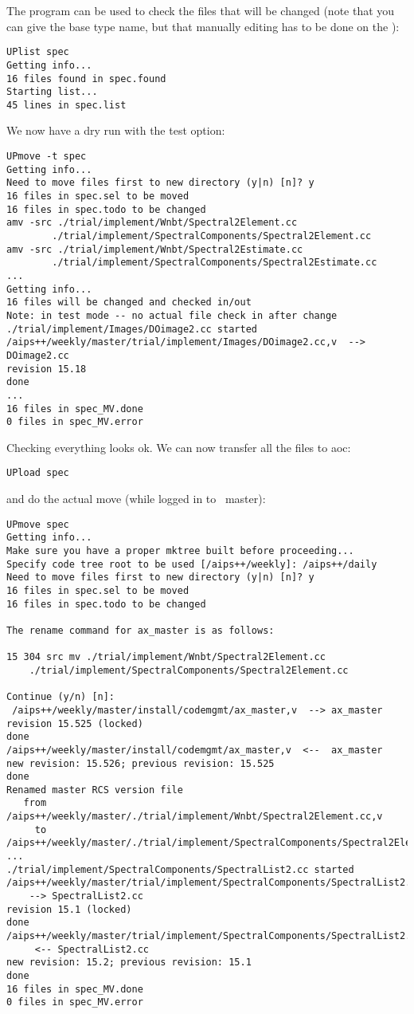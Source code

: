 \noindent
The  program can be used to check the files that will be changed
(note that you can give the base type name, but that manually editing has to
be done on the ):

\begin{verbatim}
UPlist spec
Getting info...
16 files found in spec.found
Starting list...
45 lines in spec.list
\end{verbatim}

\noindent
We now have a dry run with the  test option:

\begin{verbatim}
UPmove -t spec
Getting info...
Need to move files first to new directory (y|n) [n]? y
16 files in spec.sel to be moved
16 files in spec.todo to be changed
amv -src ./trial/implement/Wnbt/Spectral2Element.cc
		./trial/implement/SpectralComponents/Spectral2Element.cc
amv -src ./trial/implement/Wnbt/Spectral2Estimate.cc
		./trial/implement/SpectralComponents/Spectral2Estimate.cc
...
Getting info...
16 files will be changed and checked in/out
Note: in test mode -- no actual file check in after change
./trial/implement/Images/DOimage2.cc started
/aips++/weekly/master/trial/implement/Images/DOimage2.cc,v  -->  DOimage2.cc
revision 15.18
done
...
16 files in spec_MV.done
0 files in spec_MV.error
\end{verbatim}

Checking everything looks ok. We can now transfer all the files to aoc:

\begin{verbatim}
UPload spec
\end{verbatim}

\noindent
and do the actual move (while logged in to \aipspp\ master):

\begin{verbatim}
UPmove spec
Getting info...
Make sure you have a proper mktree built before proceeding...
Specify code tree root to be used [/aips++/weekly]: /aips++/daily
Need to move files first to new directory (y|n) [n]? y
16 files in spec.sel to be moved
16 files in spec.todo to be changed

The rename command for ax_master is as follows:

15 304 src mv ./trial/implement/Wnbt/Spectral2Element.cc
	./trial/implement/SpectralComponents/Spectral2Element.cc

Continue (y/n) [n]:
 /aips++/weekly/master/install/codemgmt/ax_master,v  --> ax_master 
revision 15.525 (locked)
done
/aips++/weekly/master/install/codemgmt/ax_master,v  <--  ax_master
new revision: 15.526; previous revision: 15.525
done
Renamed master RCS version file
   from /aips++/weekly/master/./trial/implement/Wnbt/Spectral2Element.cc,v
     to
/aips++/weekly/master/./trial/implement/SpectralComponents/Spectral2Element.cc,v
...
./trial/implement/SpectralComponents/SpectralList2.cc started
/aips++/weekly/master/trial/implement/SpectralComponents/SpectralList2.cc,v
 	--> SpectralList2.cc
revision 15.1 (locked)
done
/aips++/weekly/master/trial/implement/SpectralComponents/SpectralList2.cc,v
	 <-- SpectralList2.cc
new revision: 15.2; previous revision: 15.1
done
16 files in spec_MV.done
0 files in spec_MV.error
\end{verbatim}

